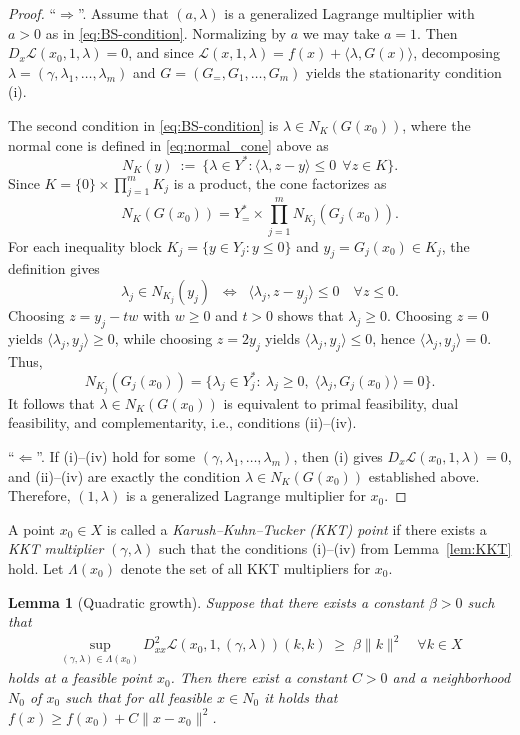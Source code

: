 \documentclass{article}
\newtheorem{lemma}[theorem]{Lemma}
\newcommand{\1}{\mathds{1}}
\begin{document}
\begin{proof}
\enquote{\emph{$\Rightarrow$}}.
Assume that $(a,\lambda)$ is a generalized Lagrange multiplier with $a>0$ as in \eqref{eq:BS-condition}.
Normalizing by $a$ we may take $a=1$.
Then $D_x \mathcal{L}(x_0,1,\lambda)=0$, and since
\(
\mathcal{L}(x,1,\lambda)=f(x)+\langle \lambda,G(x)\rangle
\),
decomposing $\lambda=(\gamma,\lambda_1,\dots,\lambda_m)$ and $G=(G_=,G_1,\dots,G_m)$ yields the stationarity condition (i).

\smallskip
The second condition in \eqref{eq:BS-condition} is $\lambda \in N_K(G(x_0))$, where the normal cone is defined in \eqref{eq:normal_cone} above as
\[
N_K(y)\ :=\ \{\lambda\in Y^*: \langle \lambda, z-y\rangle \le 0 \ \ \forall z\in K\}.
\]
Since $K=\{0\}\times\prod_{j=1}^m K_j$ is a product, the cone factorizes as
\[
N_K(G(x_0)) = Y_=^* \times \prod_{j=1}^m N_{K_j}(G_j(x_0)).
\]
For each inequality block $K_j=\{y\in Y_j: y\le 0\}$ and $y_j=G_j(x_0)\in K_j$, the definition gives
\[
\lambda_j \in N_{K_j}(y_j)
\;\;\Longleftrightarrow\;\;
\langle \lambda_j, z-y_j\rangle \le 0 \quad \forall z \le 0.
\]
Choosing $z=y_j-tw$ with $w\ge 0$ and $t>0$ shows that $\lambda_j\ge 0$.
Choosing $z=0$ yields $\langle \lambda_j, y_j\rangle \ge 0$, while choosing $z=2y_j$ yields
$\langle \lambda_j, y_j\rangle \le 0$, hence $\langle \lambda_j, y_j\rangle=0$.
Thus,
\[
N_{K_j}(G_j(x_0))=\{\lambda_j\in Y_j^*:\ \lambda_j\ge 0,\;\langle \lambda_j,G_j(x_0)\rangle=0\}.
\]
It follows that $\lambda \in N_K(G(x_0))$ is equivalent to primal feasibility, dual feasibility, and complementarity, i.e., conditions (ii)–(iv).

\smallskip
\enquote{\emph{$\Leftarrow$}}.
If (i)–(iv) hold for some $(\gamma,\lambda_1,\dots,\lambda_m)$, then (i) gives
$D_x \mathcal{L}(x_0,1,\lambda)=0$, and (ii)–(iv) are exactly the condition $\lambda \in N_K(G(x_0))$ established above.
Therefore, $(1,\lambda)$ is a generalized Lagrange multiplier for $x_0$.
\end{proof}


A point $x_0\in X$ is called a \emph{Karush–Kuhn–Tucker (KKT) point} if there exists a \emph{KKT multiplier} $(\gamma,\lambda)$ such that the conditions (i)--(iv) from Lemma~\ref{lem:KKT} hold.
Let \(\Lambda(x_0)\) denote the set of all KKT multipliers for \(x_0\).

\begin{lemma}[Quadratic growth]\label{lem:BS-3.63}
 Suppose that there exists a constant \(\beta>0\) such that
 \begin{align}\label{eq:quadratic_growth}
  \sup_{(\gamma,\lambda)\in\Lambda(x_0)}
   D_{xx}^{2}\mathcal{L}(x_0,1,(\gamma,\lambda))(k,k)
   \;\ge\;
   \beta\|k\|^{2}
   \quad
   \forall k\in X
 \end{align}
 holds at a feasible point \(x_0\).
 Then there exist a constant $C > 0$ and a neighborhood $N_0$ of $x_0$ such that for all feasible $x \in N_0$ it holds that
 \(
 f(x) \ge f(x_0) + C\|x - x_0\|^2
 \).
\end{lemma}
\end{document}
